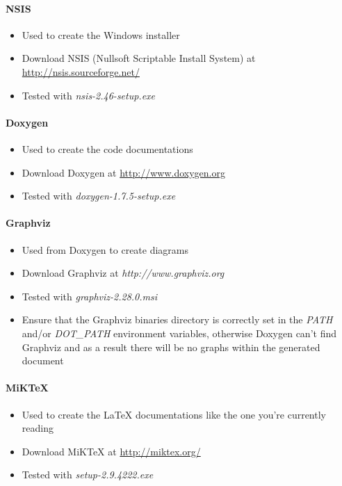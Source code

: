\paragraph{NSIS}
\begin{itemize}
\item{Used to create the Windows installer}
\item{Download NSIS (Nullsoft Scriptable Install System) at \url{http://nsis.sourceforge.net/}}
\item{Tested with \emph{nsis-2.46-setup.exe}}
\end{itemize}


\paragraph{Doxygen}
\begin{itemize}
\item{Used to create the code documentations}
\item{Download Doxygen at \url{http://www.doxygen.org}}
\item{Tested with \emph{doxygen-1.7.5-setup.exe}}
\end{itemize}


\paragraph{Graphviz}
\begin{itemize}
\item{Used from Doxygen to create diagrams}
\item{Download Graphviz at \emph{http://www.graphviz.org}}
\item{Tested with \emph{graphviz-2.28.0.msi}}
\item{Ensure that the Graphviz binaries directory is correctly set in the \emph{PATH} and/or \emph{DOT\_PATH} environment variables, otherwise Doxygen can't find Graphviz and as a result there will be no graphs within the generated document}
\end{itemize}


\paragraph{MiKTeX}
\begin{itemize}
\item{Used to create the \LaTeX{} documentations like the one you're currently reading}
\item{Download MiKTeX at \url{http://miktex.org/}}
\item{Tested with \emph{setup-2.9.4222.exe}}
\end{itemize}


